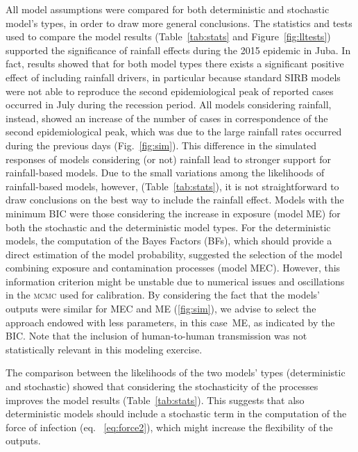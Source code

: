 All model assumptions were compared for both deterministic and stochastic model's types, in order to draw more general conclusions. The statistics and tests used to compare the model results  (Table~\ref{tab:stats} and Figure~\ref{fig:lltests}) supported the significance of rainfall effects during the 2015 epidemic in Juba. In fact, results showed that for both model types there exists a significant positive effect of including rainfall drivers, in particular because standard SIRB models were not able to reproduce the second epidemiological peak of reported cases occurred in July during the recession period. All models considering rainfall, instead, showed an increase of the number of cases in correspondence of the second epidemiological peak, which was due to the large rainfall rates occurred during the previous days (Fig.~\ref{fig:sim}). 
This difference in the simulated responses of models considering (or not) rainfall lead to stronger support for rainfall-based models. Due to the small variations among the likelihoods of rainfall-based models, however,  (Table~\ref{tab:stats}), it is not straightforward to draw conclusions on the best way to include the rainfall effect.
Models with the minimum BIC were those considering the increase in exposure (model \textsc{ME}) for both the stochastic and the deterministic model types. For the deterministic models, the computation of the Bayes Factors (BFs), which should provide a direct estimation of the model probability, suggested the selection of the model combining exposure and contamination processes (model \textsc{MEC}). However, this information criterion might be unstable due to numerical issues and oscillations in the \textsc{mcmc} used for calibration\cite{Raftery:EstimatingIntegratedLikelihood:2007}. By considering the fact that the models' outputs were similar for \textsc{MEC} and \textsc{ME} (\ref{fig:sim}), we advise to select the approach endowed with less parameters, in this case~\textsc{ME}, as indicated by the BIC. Note that the inclusion of human-to-human transmission was not statistically relevant in this modeling exercise.

The comparison between the likelihoods of the two models' types (deterministic and stochastic) showed that considering the stochasticity of the processes improves the model results (Table~\ref{tab:stats}). This suggests that also deterministic models should include a stochastic term in the computation of the force of infection (eq. ~\ref{eq:force2}), which might increase the flexibility of the outputs.

